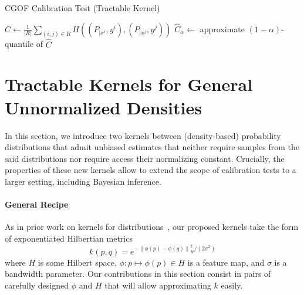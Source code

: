 \documentclass{uai2023} %
\begin{document}
\begin{algorithm}
    \DontPrintSemicolon
    \caption{CGOF Calibration Test (Tractable Kernel)}\label{alg:ccgof-tractable}
    \BlankLine
    $\widehat{C} \leftarrow \frac{1}{\lvert R \rvert } \sum\limits_{ (i, j) \in R } H((P_{|x^i}, y^i),(P_{|x^j}, y^j))$\;
    $\widehat{C}_{\alpha} \leftarrow$ approximate $(1- \alpha)$-quantile of $\widehat{C}$\;
\end{algorithm}


\section{Tractable Kernels for General Unnormalized Densities}\label{subsec:expgfd-kernel}


In this section, we introduce two kernels between (density-based) probability
distributions that admit unbiased estimates that neither require samples from
the said distributions nor require access their normalizing constant.
Crucially, the properties of these new kernels allow to extend the scope of calibration
tests to a larger setting, including Bayesian inference.

\paragraph{General Recipe} 
As in prior work on kernels for distributions~\citep{DBLP:conf/icml/MeunierPC22,DBLP:journals/jmlr/SzaboSPG16},
our proposed kernels take the form of exponentiated Hilbertian metrics
\begin{equation*}
k(p, q) = e^{- \left \| \phi(p) - \phi(q) \right \|^2_{H} / (2\sigma^2)}
\end{equation*}
where $ H $ is some Hilbert space, $ \phi \colon p \mapsto \phi(p) \in H $ is a
feature map, and $ \sigma $ is a bandwidth parameter.
Our contributions in this section consist in pairs of carefully
designed $ \phi $ and $ H $ that will allow approximating $ k $ easily.
\end{document}
